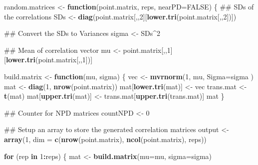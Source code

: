 \documentclass[]{article}
\newenvironment{Shaded}{\begin{snugshade}}{\end{snugshade}}
\newcommand{\KeywordTok}[1]{\textcolor[rgb]{0.13,0.29,0.53}{\textbf{#1}}}
\newcommand{\DataTypeTok}[1]{\textcolor[rgb]{0.13,0.29,0.53}{#1}}
\newcommand{\DecValTok}[1]{\textcolor[rgb]{0.00,0.00,0.81}{#1}}
\newcommand{\StringTok}[1]{\textcolor[rgb]{0.31,0.60,0.02}{#1}}
\newcommand{\OtherTok}[1]{\textcolor[rgb]{0.56,0.35,0.01}{#1}}
\newcommand{\ControlFlowTok}[1]{\textcolor[rgb]{0.13,0.29,0.53}{\textbf{#1}}}
\newcommand{\OperatorTok}[1]{\textcolor[rgb]{0.81,0.36,0.00}{\textbf{#1}}}
\newcommand{\NormalTok}[1]{#1}
\begin{document}
\begin{Shaded}
\begin{Highlighting}[]
\NormalTok{random.matrices <-}\StringTok{ }\ControlFlowTok{function}\NormalTok{(point.matrix, reps, }\DataTypeTok{nearPD=}\OtherTok{FALSE}\NormalTok{) \{}
\NormalTok{  ## SDs of the correlations}
\NormalTok{  SDs <-}\StringTok{ }\KeywordTok{diag}\NormalTok{(point.matrix[,,}\DecValTok{2}\NormalTok{][}\KeywordTok{lower.tri}\NormalTok{(point.matrix[,,}\DecValTok{2}\NormalTok{])])}

\NormalTok{  ## Convert the SDs to Variances}
\NormalTok{  sigma <-}\StringTok{ }\NormalTok{SDs}\OperatorTok{^}\DecValTok{2}
  
\NormalTok{  ## Mean of correlation vector}
\NormalTok{  mu <-}\StringTok{ }\NormalTok{point.matrix[,,}\DecValTok{1}\NormalTok{][}\KeywordTok{lower.tri}\NormalTok{(point.matrix[,,}\DecValTok{1}\NormalTok{])]}
    
\NormalTok{  build.matrix <-}\StringTok{ }\ControlFlowTok{function}\NormalTok{(mu, sigma)  \{}
\NormalTok{    vec <-}\StringTok{ }\KeywordTok{mvrnorm}\NormalTok{(}\DecValTok{1}\NormalTok{, mu, }\DataTypeTok{Sigma=}\NormalTok{sigma )}
\NormalTok{    mat <-}\StringTok{ }\KeywordTok{diag}\NormalTok{(}\DecValTok{1}\NormalTok{, }\KeywordTok{nrow}\NormalTok{(point.matrix))}
\NormalTok{    mat[}\KeywordTok{lower.tri}\NormalTok{(mat)] <-}\StringTok{ }\NormalTok{vec}
\NormalTok{    trans.mat <-}\StringTok{ }\KeywordTok{t}\NormalTok{(mat)}
\NormalTok{    mat[}\KeywordTok{upper.tri}\NormalTok{(mat)] <-}\StringTok{ }\NormalTok{trans.mat[}\KeywordTok{upper.tri}\NormalTok{(trans.mat)]}
\NormalTok{    mat}
\NormalTok{  \}}
 
\NormalTok{  ## Counter for NPD matrices}
\NormalTok{  countNPD <-}\StringTok{ }\DecValTok{0}
  
\NormalTok{  ## Setup an array to store the generated correlation matrices}
\NormalTok{  output <-}\StringTok{ }\KeywordTok{array}\NormalTok{(}\DecValTok{1}\NormalTok{, }\DataTypeTok{dim =} \KeywordTok{c}\NormalTok{(}\KeywordTok{nrow}\NormalTok{(point.matrix), }\KeywordTok{ncol}\NormalTok{(point.matrix), reps))}
  
  \ControlFlowTok{for}\NormalTok{ (rep }\ControlFlowTok{in} \DecValTok{1}\OperatorTok{:}\NormalTok{reps) \{ }
\NormalTok{    mat <-}\StringTok{ }\KeywordTok{build.matrix}\NormalTok{(}\DataTypeTok{mu=}\NormalTok{mu, }\DataTypeTok{sigma=}\NormalTok{sigma)}
    

\end{Highlighting}
\end{Shaded}
\end{document}
